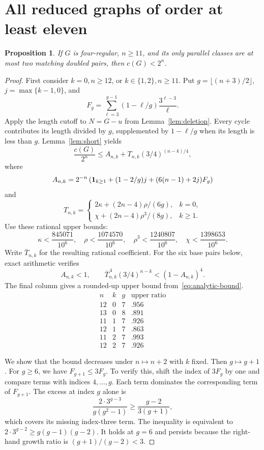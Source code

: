 \documentclass[11pt]{article}
\newtheorem{proposition}[theorem]{Proposition}
\begin{document}
\section{All reduced graphs of order at least eleven}

\begin{proposition}\label{prop:large}
If $G$ is four-regular, $n\ge11$, and its only parallel classes are at most two matching doubled pairs, then $c(G)<2^n$.
\end{proposition}

\begin{proof}
First consider $k=0,n\ge12$, or $k\in\{1,2\},n\ge11$.
Put $g=\lfloor(n+3)/2\rfloor$, $j=\max\{k-1,0\}$, and
\[
 F_g=\sum_{\ell=3}^{g-1}(1-\ell/g)\frac{3^{\ell-3}}\ell.
\]
Apply the length cutoff to $N=G-u$ from Lemma~\ref{lem:deletion}.
Every cycle contributes its length divided by $g$, supplemented by $1-\ell/g$ when its length is less than $g$.
Lemma~\ref{lem:short} yields
\begin{equation}\label{eq:analytic-bound}
 \frac{c(G)}{2^n}\le A_{n,k}+T_{n,k}(3/4)^{(n-k)/4},
\end{equation}
where
\[
 A_{n,k}=2^{-n}\left({\bf1}_{k\ge1}+(1-2/g)j+(6(n-1)+2j)F_g\right)
\]
and
\[
 T_{n,k}=\begin{cases}
 2\kappa+(2n-4)\rho/(6g),&k=0,\\
 \chi+(2n-4)\rho^3/(8g),&k\ge1.
 \end{cases}
\]
Use these rational upper bounds:
\begin{equation}\label{eq:rational-constants}
 \kappa<\frac{845071}{10^6},\quad
 \rho<\frac{1074570}{10^6},\quad
 \rho^3<\frac{1240807}{10^6},\quad
 \chi<\frac{1398653}{10^6}.
\end{equation}
Write $\overline T_{n,k}$ for the resulting rational coefficient.
For the six base pairs below, exact arithmetic verifies
\[
 A_{n,k}<1,\qquad
 \overline T_{n,k}^{\,4}(3/4)^{n-k}<(1-A_{n,k})^4.
\]
The final column gives a rounded-up upper bound from~\eqref{eq:analytic-bound}.
\[
\begin{array}{c|c|c|c}
 n&k&g&\text{upper ratio}\\\hline
 12&0&7&.956\\
 13&0&8&.891\\
 11&1&7&.926\\
 12&1&7&.863\\
 11&2&7&.993\\
 12&2&7&.926
\end{array}
\]

We show that the bound decreases under $n\mapsto n+2$ with $k$ fixed.
Then $g\mapsto g+1$.
For $g\ge6$, we have $F_{g+1}\le3F_g$.
To verify this, shift the index of $3F_g$ by one and compare terms with indices $4,\ldots,g$.
Each term dominates the corresponding term of $F_{g+1}$.
The excess at index $g$ alone is
\[
 \frac{2\cdot3^{g-3}}{g(g^2-1)}
 \ge\frac{g-2}{3(g+1)},
\]
which covers its missing index-three term.
The inequality is equivalent to $2\cdot3^{g-2}\ge g(g-1)(g-2)$.
It holds at $g=6$ and persists because the right-hand growth ratio is $(g+1)/(g-2)<3$.


\end{proof}
\end{document}

